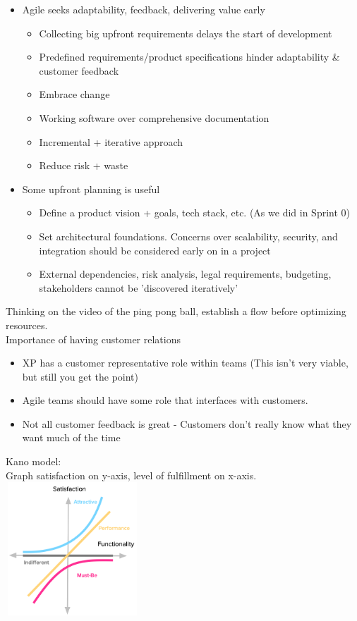 \documentclass[10pt]{article}
\begin{document}
\begin{itemize}
\item Agile seeks adaptability, feedback, delivering value early
\begin{itemize}
\item Collecting big upfront requirements delays the start of development
\item Predefined requirements/product specifications hinder adaptability \& customer feedback
\item Embrace change
\item Working software over comprehensive documentation
\item Incremental + iterative approach
\item Reduce risk + waste
\end{itemize}
\item Some upfront planning is useful
\begin{itemize}
\item Define a product vision + goals, tech stack, etc. (As we did in Sprint 0)
\item Set architectural foundations. Concerns over scalability, security, and integration should be considered early on in a project
\item External dependencies, risk analysis, legal requirements, budgeting, stakeholders cannot be 'discovered iteratively'
\end{itemize}
\end{itemize}
Thinking on the video of the ping pong ball, establish a flow before optimizing resources.\\
Importance of having customer relations
\begin{itemize}
\item XP has a customer representative role within teams (This isn't very viable, but still you get the point)
\item Agile teams should have some role that interfaces with customers.
\item Not all customer feedback is great - Customers don't really know what they want much of the time
\end{itemize}
Kano model:\\
Graph satisfaction on y-axis, level of fulfillment on x-axis.\\
\includegraphics[width=5cm, height=5cm]{kano}\\
\end{document}
